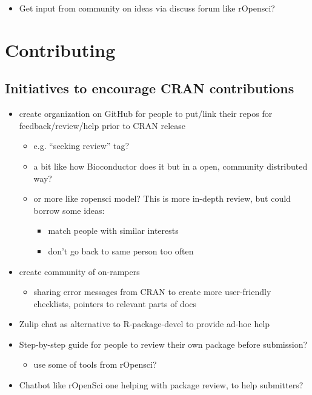 \documentclass[]{book}
\providecommand{\tightlist}{%
  \setlength{\itemsep}{0pt}\setlength{\parskip}{0pt}}
\begin{document}
\begin{itemize}
\tightlist
\item
  Get input from community on ideas via discuss forum like rOpensci?
\end{itemize}

\hypertarget{contributing}{%
\chapter{Contributing}\label{contributing}}

\hypertarget{initiatives-to-encourage-cran-contributions}{%
\section{Initiatives to encourage CRAN contributions}\label{initiatives-to-encourage-cran-contributions}}

\begin{itemize}
\tightlist
\item
  create organization on GitHub for people to put/link their repos for feedback/review/help prior to CRAN release

  \begin{itemize}
  \tightlist
  \item
    e.g. ``seeking review'' tag?
  \item
    a bit like how Bioconductor does it but in a open, community distributed way?
  \item
    or more like ropensci model? This is more in-depth review, but could borrow some ideas:

    \begin{itemize}
    \tightlist
    \item
      match people with similar interests
    \item
      don't go back to same person too often
    \end{itemize}
  \end{itemize}
\item
  create community of on-rampers

  \begin{itemize}
  \tightlist
  \item
    sharing error messages from CRAN to create more user-friendly checklists, pointers to relevant parts of docs
  \end{itemize}
\item
  Zulip chat as alternative to R-package-devel to provide ad-hoc help
\item
  Step-by-step guide for people to review their own package before submission?

  \begin{itemize}
  \tightlist
  \item
    use some of tools from rOpensci?
  \end{itemize}
\item
  Chatbot like rOpenSci one helping with package review, to help submitters?
\end{itemize}


\end{document}
